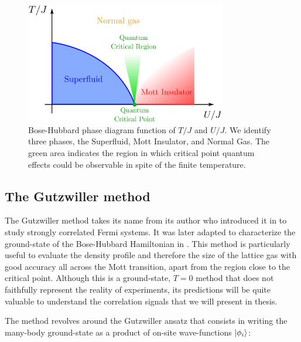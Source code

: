 \begin{figure}
    \centering
    \includegraphics[width=0.78\textwidth]{Fig/Chapter2/phase_diagram.png}
    \caption{Bose-Hubbard phase diagram function of $T/J$ and $U/J$. We identify three phases, the Superfluid, Mott Insulator, and Normal Gas. The green area indicates the region in which critical point quantum effects could be observable in spite of the finite temperature.}
    \label{fig:phase_diagram}
\end{figure}



\subsection{The Gutzwiller method}

The Gutzwiller method takes its name from its author who introduced it in \cite{gutzwiller1963effect} to study strongly correlated Fermi systems. It was later adapted to characterize the ground-state of the Bose-Hubbard Hamiltonian in \cite{rokhsar1991gutzwiller}. This method is particularly useful to evaluate the density profile and therefore the size of the lattice gas with good accuracy all across the Mott transition, apart from the region close to the critical point. Although this is a ground-state, $T=0$ method that does not faithfully represent the reality of experiments, its predictions will be quite valuable to understand the correlation signals that we will present in thesis.

The method revolves around the Gutzwiller ansatz that consists in writing the many-body ground-state as a product of on-site wave-functions $\ket{\phi_i}$:

